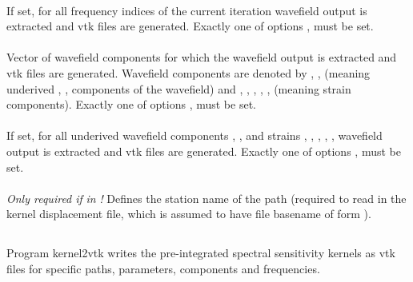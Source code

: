 \paragraph{}
If set, for all frequency indices of the current iteration wavefield output is extracted and 
vtk files are generated. Exactly one of options  ,  must be set.
\paragraph{}
Vector of  wavefield components for which the wavefield output is extracted and 
vtk files are generated. 
Wavefield components are denoted by , ,  (meaning underived , , 
 components of the wavefield) and , , , , ,  
(meaning strain components). 
Exactly one of options ,  must be set.
\paragraph{}
If set, for all underived wavefield components , ,  and
strains , , , , ,  wavefield output is extracted and 
vtk files are generated. 
Exactly one of options ,  must be set.
\paragraph{}
\emph{Only required if}  \emph{in}  \emph{!}
Defines the station name of the path (required to read in the kernel displacement file, which is assumed
to have file basename of form ).
%
%
\subsection{} \label{programs_scripts,sec:bin_prog,sec:kernel_2_vtk}
Program kernel2vtk writes the pre-integrated spectral sensitivity kernels as vtk files for specific paths, parameters, components and frequencies.
